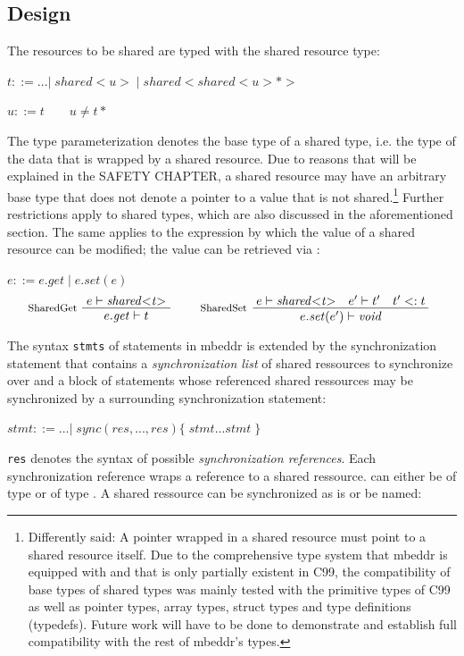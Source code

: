 \subsection{Design}
The resources to be shared are typed with the shared resource type:

$ t ::= ...|\;\mathit{shared{<}u{>}}\;|\;\mathit{shared{<}shared{<}u{>}{*}{>}}\;$

$ u ::= t \qquad u \neq t*$

The type parameterization denotes the base type of a shared type, i.e. the type of the data that is wrapped by a shared resource. Due to reasons that will be explained in the SAFETY CHAPTER, a shared resource may have an arbitrary base type that does not denote a pointer to a value that is not shared.\footnote{Differently said: A pointer wrapped in a shared resource must point to a shared resource itself. Due to the comprehensive type system that mbeddr is equipped with and that is only partially existent in C99, the compatibility of base types of shared types was mainly tested with the primitive types of C99 as well as pointer types, array types, struct types and type definitions (typedefs). Future work will have to be done to demonstrate and establish full compatibility with the rest of mbeddr's types.} Further restrictions apply to shared types, which are also discussed in the aforementioned section. The same applies to the  expression by which the value of a shared resource can be modified; the value can be retrieved via :

$ e ::= e.\mathit{get}\;|\;e.\mathit{set(e)} $
\begin{align*}
\inference*[SharedGet]{e |- \mathit{shared{<}t{>}}} {\quad e.\mathit{get} |- t \quad}
\qquad
\inference*[SharedSet]{e |- \mathit{shared{<}t{>}} \quad e' |- t' \quad t' <: t} {\qquad\quad e.\mathit{set}(e') |- \mathit{void} \quad\qquad} 
\end{align*}

The syntax \texttt{stmts} of statements in mbeddr is extended by the synchronization statement  that contains a \textit{synchronization list} of shared ressources to synchronize over and a block of statements whose referenced shared ressources may be synchronized by a surrounding synchronization statement:

$ \mathit{stmt} ::= ...
        |\;\mathit{sync}(res, ..., res) \{\;\mathit{stmt} ... \mathit{stmt}\;\}$
        
\texttt{res} denotes the syntax of possible \textit{synchronization references}. Each synchronization reference  wraps a reference  to a shared ressource.  can either be of type  or of type . A shared ressource can be synchronized as is or be named:

